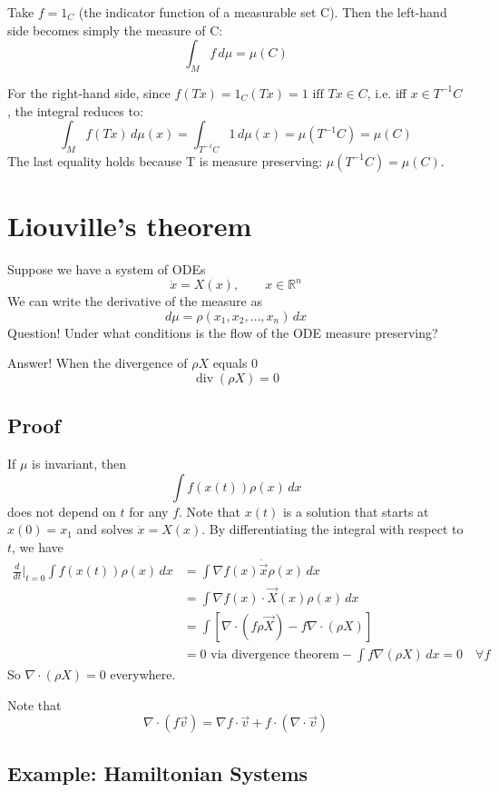 \documentclass{article}
\begin{document}
Take $f = 1_C$ (the indicator function of a measurable set C).
Then the left-hand side becomes simply the measure of C:
\[\int_M f \, d\mu = \mu(C)\]

For the right-hand side, since $f(Tx) = 1_C(Tx) = 1 \text{ iff } Tx \in C$,
i.e. iff $x \in T^{-1}C$, the integral reduces to:
\[\int_M f(Tx) \, d\mu(x) = \int_{T^{-1}C} 1 \, d\mu(x) = \mu(T^{-1}C) = \mu(C)\]
The last equality holds because T is measure preserving: $\mu(T^{-1}C) = \mu(C).$

\section{Liouville's theorem}

Suppose we have a system of ODEs 
\[
\dot{x}=X(x),\qquad x\in\mathbb{R}^n
\]
We can write the derivative of the measure as 
\[
d\mu = \rho\left(x_1,x_2,\ldots,x_n\right)\,dx
\]
Question! Under what conditions is the flow of the ODE measure preserving?

Answer! When the divergence of $\rho X$ equals 0
\[
\operatorname{div}\left(\rho X\right)=0
\]

\subsection{Proof}

If $\mu$ is invariant, then 
\[
\int f(x(t))\rho(x) \, dx
\]
does not depend on $t$ for any $f$. Note that $x(t)$ is a solution that starts at $x(0)=x_1$ and solves $\dot{x}=X(x)$. By differentiating the integral with respect to $t$, we have 
\begin{align*}
    \frac{d}{dt}\Bigg|_{t=0}\int f(x(t))\rho(x) \, dx &= \int \nabla f(x) \dot{\vec{x}} \rho(x) \, dx\\
    &= \int \nabla f(x) \cdot \vec{X}(x) \rho (x) \, dx \\
    &= \int \left[\nabla\cdot \left(f\rho \vec{X}\right) - f\nabla\cdot \left(\rho X\right)\right]\\
    &= 0 \text{ via divergence theorem} - \int f\nabla \left(\rho X\right)\, dx = 0 \quad \forall f
\end{align*}
So $\nabla \cdot (\rho X)=0$ everywhere.

Note that 
\[
\nabla\cdot\left(f\vec{v}\right) = \nabla f\cdot \vec{v}+f\cdot\left(\nabla\cdot\vec{v}\right)
\]

\subsection{Example: Hamiltonian Systems}
\end{document}
